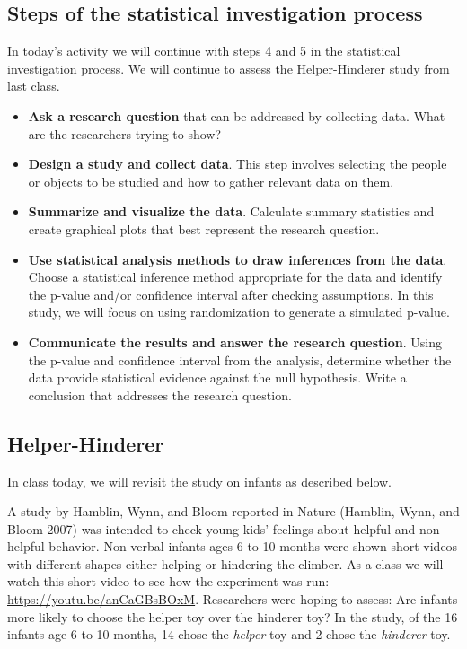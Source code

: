 \documentclass[
]{report}
\begin{document}
\subsection{Steps of the statistical investigation process}\label{steps-of-the-statistical-investigation-process-3}

In today's activity we will continue with steps 4 and 5 in the statistical investigation process. We will continue to assess the Helper-Hinderer study from last class.

\begin{itemize}
\item
  \textbf{Ask a research question} that can be addressed by collecting data. What are the researchers trying to show?
\item
  \textbf{Design a study and collect data}. This step involves selecting the people or objects to be studied and how to gather relevant data on them.
\item
  \textbf{Summarize and visualize the data}. Calculate summary statistics and create graphical plots that best represent the research question.
\item
  \textbf{Use statistical analysis methods to draw inferences from the data}. Choose a statistical inference method appropriate for the data and identify the p-value and/or confidence interval after checking assumptions. In this study, we will focus on using randomization to generate a simulated p-value.
\item
  \textbf{Communicate the results and answer the research question}. Using the p-value and confidence interval from the analysis, determine whether the data provide statistical evidence against the null hypothesis. Write a conclusion that addresses the research question.
\end{itemize}

\subsection{Helper-Hinderer}\label{helper-hinderer-1}

In class today, we will revisit the study on infants as described below.

A study by Hamblin, Wynn, and Bloom reported in Nature (Hamblin, Wynn, and Bloom 2007) was intended to check young kids' feelings about helpful and non-helpful behavior. Non-verbal infants ages 6 to 10 months were shown short videos with different shapes either helping or hindering the climber. As a class we will watch this short video to see how the experiment was run: \url{https://youtu.be/anCaGBsBOxM}. Researchers were hoping to assess: Are infants more likely to choose the helper toy over the hinderer toy? In the study, of the 16 infants age 6 to 10 months, 14 chose the \emph{helper} toy and 2 chose the \emph{hinderer} toy.
\end{document}
